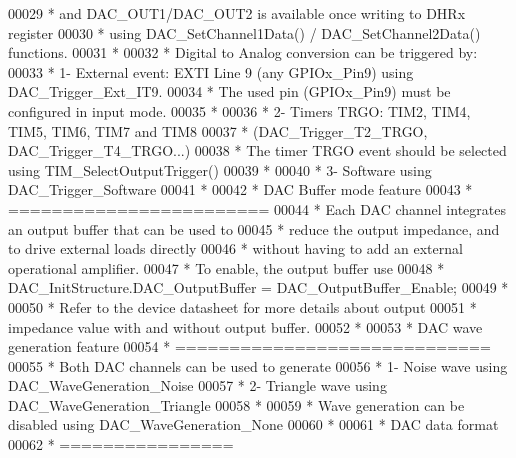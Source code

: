 \begin{DoxyCode}
00029 \textcolor{comment}{  *          and DAC\_OUT1/DAC\_OUT2 is available once writing to DHRx register }
00030 \textcolor{comment}{  *          using DAC\_SetChannel1Data() / DAC\_SetChannel2Data() functions.}
00031 \textcolor{comment}{  *   }
00032 \textcolor{comment}{  *         Digital to Analog conversion can be triggered by:}
00033 \textcolor{comment}{  *             1- External event: EXTI Line 9 (any GPIOx\_Pin9) using DAC\_Trigger\_Ext\_IT9.}
00034 \textcolor{comment}{  *                The used pin (GPIOx\_Pin9) must be configured in input mode.}
00035 \textcolor{comment}{  *}
00036 \textcolor{comment}{  *             2- Timers TRGO: TIM2, TIM4, TIM5, TIM6, TIM7 and TIM8 }
00037 \textcolor{comment}{  *                (DAC\_Trigger\_T2\_TRGO, DAC\_Trigger\_T4\_TRGO...)}
00038 \textcolor{comment}{  *                The timer TRGO event should be selected using TIM\_SelectOutputTrigger()}
00039 \textcolor{comment}{  *}
00040 \textcolor{comment}{  *             3- Software using DAC\_Trigger\_Software}
00041 \textcolor{comment}{  *}
00042 \textcolor{comment}{  *          DAC Buffer mode feature}
00043 \textcolor{comment}{  *          ========================  }
00044 \textcolor{comment}{  *          Each DAC channel integrates an output buffer that can be used to }
00045 \textcolor{comment}{  *          reduce the output impedance, and to drive external loads directly}
00046 \textcolor{comment}{  *          without having to add an external operational amplifier.}
00047 \textcolor{comment}{  *          To enable, the output buffer use  }
00048 \textcolor{comment}{  *              DAC\_InitStructure.DAC\_OutputBuffer = DAC\_OutputBuffer\_Enable;}
00049 \textcolor{comment}{  *          }
00050 \textcolor{comment}{  *          Refer to the device datasheet for more details about output }
00051 \textcolor{comment}{  *          impedance value with and without output buffer.}
00052 \textcolor{comment}{  *          }
00053 \textcolor{comment}{  *          DAC wave generation feature}
00054 \textcolor{comment}{  *          =============================      }
00055 \textcolor{comment}{  *          Both DAC channels can be used to generate}
00056 \textcolor{comment}{  *             1- Noise wave using DAC\_WaveGeneration\_Noise}
00057 \textcolor{comment}{  *             2- Triangle wave using DAC\_WaveGeneration\_Triangle}
00058 \textcolor{comment}{  *        }
00059 \textcolor{comment}{  *          Wave generation can be disabled using DAC\_WaveGeneration\_None}
00060 \textcolor{comment}{  *}
00061 \textcolor{comment}{  *          DAC data format}
00062 \textcolor{comment}{  *          ================   }

\end{DoxyCode}
